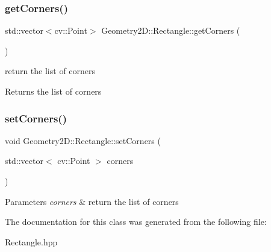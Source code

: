 \subsubsection{\texorpdfstring{get\+Corners()}{getCorners()}}
{\footnotesize\ttfamily std\+::vector$<$cv\+::\+Point$>$ Geometry2\+D\+::\+Rectangle\+::get\+Corners (\begin{DoxyParamCaption}{ }\end{DoxyParamCaption})}

return the list of corners \begin{DoxyReturn}{Returns}
the list of corners 
\end{DoxyReturn}
\mbox{\label{class_geometry2_d_1_1_rectangle_a5fc314db2e50e7b7b9360900d37ad212}} 
\subsubsection{\texorpdfstring{set\+Corners()}{setCorners()}}
{\footnotesize\ttfamily void Geometry2\+D\+::\+Rectangle\+::set\+Corners (\begin{DoxyParamCaption}\item[{std\+::vector$<$ cv\+::\+Point $>$}]{corners }\end{DoxyParamCaption})}


\begin{DoxyParams}{Parameters}
{\em corners} & return the list of corners \\
\hline
\end{DoxyParams}


The documentation for this class was generated from the following file\+:\begin{DoxyCompactItemize}
\item 
Rectangle.\+hpp\end{DoxyCompactItemize}
